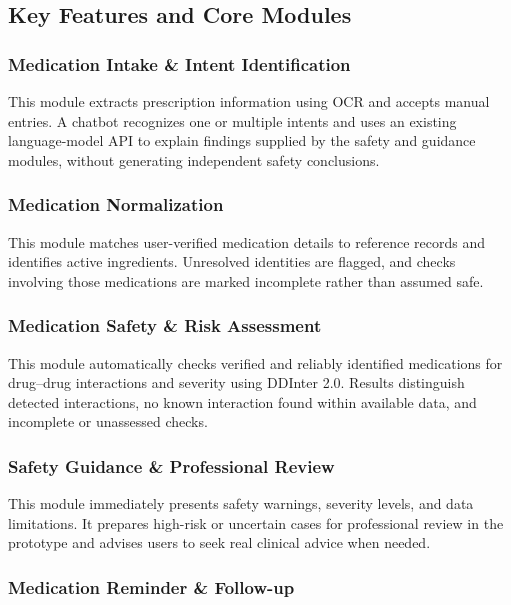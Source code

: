 \subsection{Key Features and Core Modules}

\subsubsection{Medication Intake \& Intent Identification}

This module extracts prescription information using OCR and accepts manual entries. A chatbot recognizes one or multiple intents and uses an existing language-model API to explain findings supplied by the safety and guidance modules, without generating independent safety conclusions.

\subsubsection{Medication Normalization}

This module matches user-verified medication details to reference records and identifies active ingredients. Unresolved identities are flagged, and checks involving those medications are marked incomplete rather than assumed safe.

\subsubsection{Medication Safety \& Risk Assessment}

This module automatically checks verified and reliably identified medications for drug--drug interactions and severity using DDInter 2.0. Results distinguish detected interactions, no known interaction found within available data, and incomplete or unassessed checks.

\subsubsection{Safety Guidance \& Professional Review}

This module immediately presents safety warnings, severity levels, and data limitations. It prepares high-risk or uncertain cases for professional review in the prototype and advises users to seek real clinical advice when needed.

\subsubsection{Medication Reminder \& Follow-up}

